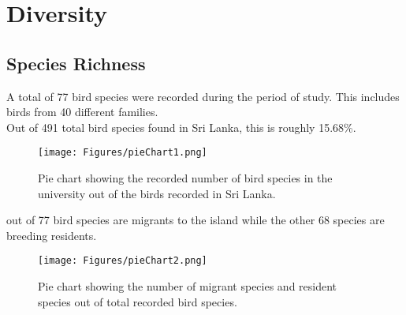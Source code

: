 \chapter{Diversity}
\label{cp:Diversity}

\section{Species Richness}
A total of 77 bird species were recorded during the period of study. This includes birds from 40 different families.\\
Out of 491 total bird species found in Sri Lanka, this is roughly 15.68\%.

\begin{figure}[!htpb]
    \centering
    \texttt{[image: Figures/pieChart1.png]}
    \caption[]{Pie chart showing the recorded number of bird species in the university out of the birds recorded in Sri Lanka.}
    \label{fig:figure-01}
\end{figure}
 out of 77 bird species are migrants to the island while the other 68 species are breeding residents. 

\begin{figure}[!htpb]
    \centering
    \texttt{[image: Figures/pieChart2.png]}
    \caption[]{Pie chart showing the number of migrant species and resident species out of total recorded bird species.}
    \label{fig:figure-01}
\end{figure}
